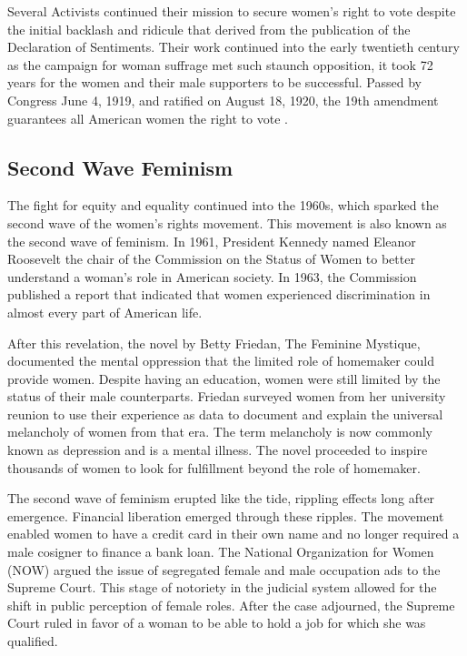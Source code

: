 \documentclass[12pt, English]{article}
\begin{document}
Several Activists continued their mission to secure women's right to vote despite the initial backlash and ridicule that derived from the publication of the Declaration of Sentiments. Their work continued into the early twentieth century as the campaign for woman suffrage met such staunch opposition, it took 72 years for the women and their male supporters to be successful. Passed by Congress June 4, 1919, and ratified on August 18, 1920, the 19th amendment guarantees all American women the right to vote \citep{NINETEENTH}. 


\subsection*{Second Wave Feminism}
The fight for equity and equality continued into the 1960s, which sparked the second wave of the women's rights movement. This movement is also known as the second wave of feminism. In 1961, President Kennedy named Eleanor Roosevelt the chair of the Commission on the Status of Women to better understand a woman's role in American society.  In 1963, the Commission published a report that indicated that women experienced discrimination in almost every part of American life.  

After this revelation, the novel by Betty Friedan, The Feminine Mystique, documented the mental oppression that the limited role of homemaker could provide women. Despite having an education, women were still limited by the status of their male counterparts. Friedan surveyed women from her university reunion to use their experience as data to document and explain the universal melancholy of women from that era. The term melancholy is now commonly known as depression and is a mental illness. The novel proceeded to inspire thousands of women to look for fulfillment beyond the role of homemaker.

The second wave of feminism erupted like the tide, rippling effects long after emergence. Financial liberation emerged through these ripples. The movement enabled women to have a credit card in their own name and no longer required a male cosigner to finance a bank loan. The National Organization for Women (NOW) argued the issue of segregated female and male occupation ads to the Supreme Court. This stage of notoriety in the judicial system allowed for the shift in public perception of female roles. After the case adjourned, the Supreme Court ruled in favor of a woman to be able to hold a job for which she was qualified. 
\end{document}
